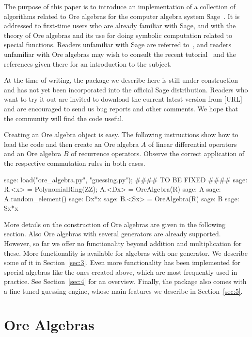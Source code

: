 \documentclass{amsart}
\begin{document}
The purpose of this paper is to introduce an implementation of a collection of
algorithms related to Ore algebras for the computer algebra system
Sage~\cite{..}. It is addressed to first-time users who are already familiar
with Sage, and with the theory of Ore algebras and its use for doing symbolic
computation related to special functions. Readers unfamiliar with Sage are referred
to~\cite{..}, and readers unfamiliar with Ore algebras may wish to consult the
recent tutorial~\cite{..} and the references given there for an introduction to
the subject.

At the time of writing, the package we describe here is still under construction
and has not yet been incorporated into the official Sage distribution. Readers
who want to try it out are invited to download the current latest version from 
[URL] and are encouraged to send us bug reports and other comments. We hope 
that the community will find the code useful.

Creating an Ore algebra object is easy. The following instructions show how to 
load the code and then create an Ore algebra $A$ of linear differential operators
and an Ore algebra $B$ of recurrence operators. Observe the correct application
of the respective commutation rules in both cases. 

\begin{sageexample}
  sage: load("ore_algebra.py", "guessing.py");  #### TO BE FIXED ####
  sage: R.<x> = PolynomialRing(ZZ); A.<Dx> = OreAlgebra(R)
  sage: A
  sage: A.random_element()
  sage: Dx*x
  sage: B.<Sx> = OreAlgebra(R)
  sage: B
  sage: Sx*x
\end{sageexample}

More details on the construction of Ore algebras are given in the following section.
Also Ore algebras with several generators are already supported. However, so far we offer
no functionality beyond addition and multiplication for these. More functionality 
is available for algebras with one generator. We describe some of it in 
Section~\ref{sec:3}. Even more functionality has been implemented for special 
algebras like the ones created above, which are most frequently used in practice. 
See Section~\ref{sec:4} for an overview. Finally, the package also comes with a 
fine tuned guessing engine, whose main features we describe in Section~\ref{sec:5}.

\section{Ore Algebras}
\end{document}
